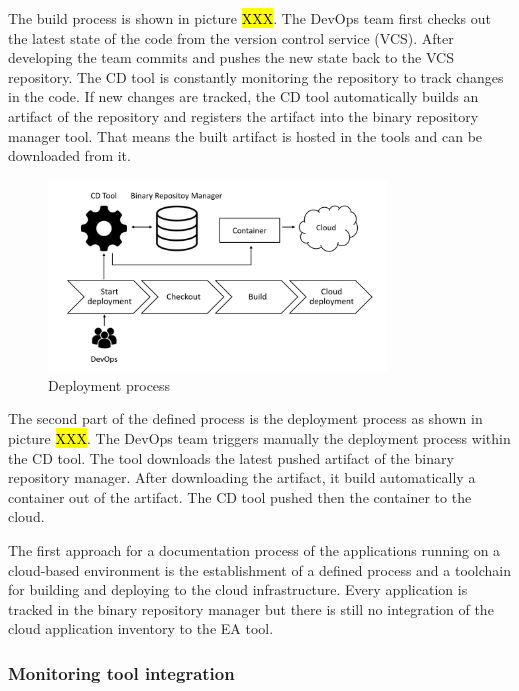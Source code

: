 The build process is shown in picture \hl{XXX}. The DevOps team first checks out the latest state of the code from the version control service (VCS). After developing the team commits and pushes the new state back to the VCS repository. The CD tool is constantly monitoring the repository to track changes in the code. If new changes are tracked, the CD tool automatically builds an artifact of the repository and registers the artifact into the binary repository manager tool. That means the built artifact is hosted in the tools and can be downloaded from it.

\begin{figure}[htpb]
  \centering
  \includegraphics[width=0.8\textwidth]{figures/deployment-process.PNG}
  \caption{ Deployment process~\parencite{Corpancho Villasana 2018}}
  \label{fig:Deployment-process}
\end{figure}

The second part of the defined process is the deployment process as shown in picture \hl{XXX}. The DevOps team triggers manually the deployment process within the CD tool. The tool downloads the latest pushed artifact of the binary repository manager. After downloading the artifact, it build automatically a container out of the artifact. The CD tool pushed then the container to the cloud.

The first approach for a documentation process of the applications running on a cloud-based environment is the establishment of a defined process and a toolchain for building and deploying to the cloud infrastructure. Every application is tracked in the binary repository manager but there is still no integration of the cloud application inventory to the EA tool.

\subsubsection{Monitoring tool integration}

